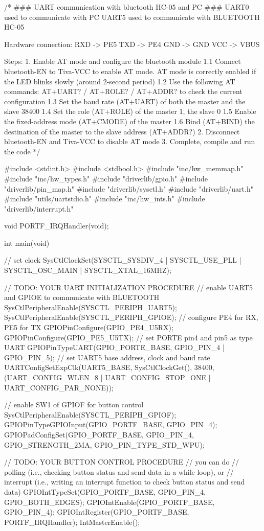 \documentclass[12pt, a4paper]{article}
\begin{document}
\begin{code}
/*
### UART communication with bluetooth HC-05 and PC ###
UART0 used to communicate with PC
UART5 used to communicate with BLUETOOTH HC-05

Hardware connection:
RXD -> PE5
TXD -> PE4
GND -> GND
VCC -> VBUS

Steps:
1. Enable AT mode and configure the bluetooth module
    1.1 Connect bluetooth-EN to Tiva-VCC to enable AT mode. AT mode is correctly enabled if the LED blinks slowly (around 2-second period)
    1.2 Use the following AT commands: AT+UART? / AT+ROLE? / AT+ADDR? to check the current configuration
    1.3 Set the baud rate (AT+UART) of both the master and the slave 38400
    1.4 Set the role (AT+ROLE) of the master 1, the slave 0
    1.5 Enable the fixed-address mode (AT+CMODE) of the master
    1.6 Bind (AT+BIND) the destination of the master to the slave address (AT+ADDR?)
2. Disconnect bluetooth-EN and Tiva-VCC to disable AT mode
3. Complete, compile and run the code
*/

#include <stdint.h>
#include <stdbool.h>
#include "inc/hw_memmap.h"
#include "inc/hw_types.h"
#include "driverlib/gpio.h"
#include "driverlib/pin_map.h"
#include "driverlib/sysctl.h"
#include "driverlib/uart.h"
#include "utils/uartstdio.h"
#include "inc/hw_ints.h"
#include "driverlib/interrupt.h"


void PORTF_IRQHandler(void);

int main(void) {
    // set clock
    SysCtlClockSet(SYSCTL_SYSDIV_4 | SYSCTL_USE_PLL | SYSCTL_OSC_MAIN | SYSCTL_XTAL_16MHZ);

    // TODO: YOUR UART INITIALIZATION PROCEDURE
    // enable UART5 and GPIOE to communicate with BLUETOOTH
    SysCtlPeripheralEnable(SYSCTL_PERIPH_UART5);
    SysCtlPeripheralEnable(SYSCTL_PERIPH_GPIOE);
    // configure PE4 for RX, PE5 for TX
    GPIOPinConfigure(GPIO_PE4_U5RX);
    GPIOPinConfigure(GPIO_PE5_U5TX);
    // set PORTE pin4 and pin5 as type UART
    GPIOPinTypeUART(GPIO_PORTE_BASE, GPIO_PIN_4 | GPIO_PIN_5);
    // set UART5 base address, clock and baud rate
    UARTConfigSetExpClk(UART5_BASE, SysCtlClockGet(), 38400,
        (UART_CONFIG_WLEN_8 | UART_CONFIG_STOP_ONE | UART_CONFIG_PAR_NONE));

    // enable SW1 of GPIOF for button control
    SysCtlPeripheralEnable(SYSCTL_PERIPH_GPIOF);
    GPIOPinTypeGPIOInput(GPIO_PORTF_BASE, GPIO_PIN_4);
    GPIOPadConfigSet(GPIO_PORTF_BASE, GPIO_PIN_4, GPIO_STRENGTH_2MA, GPIO_PIN_TYPE_STD_WPU);

    // TODO: YOUR BUTTON CONTROL PROCEDURE
    // you can do
    // polling (i.e., checking button status and send data in a while loop), or
    // interrupt (i.e., writing an interrupt function to check button status and send data)
    GPIOIntTypeSet(GPIO_PORTF_BASE, GPIO_PIN_4, GPIO_BOTH_EDGES);
    GPIOIntEnable(GPIO_PORTF_BASE, GPIO_PIN_4);
    GPIOIntRegister(GPIO_PORTF_BASE, PORTF_IRQHandler);
    IntMasterEnable();
}


\end{code}
\end{document}

